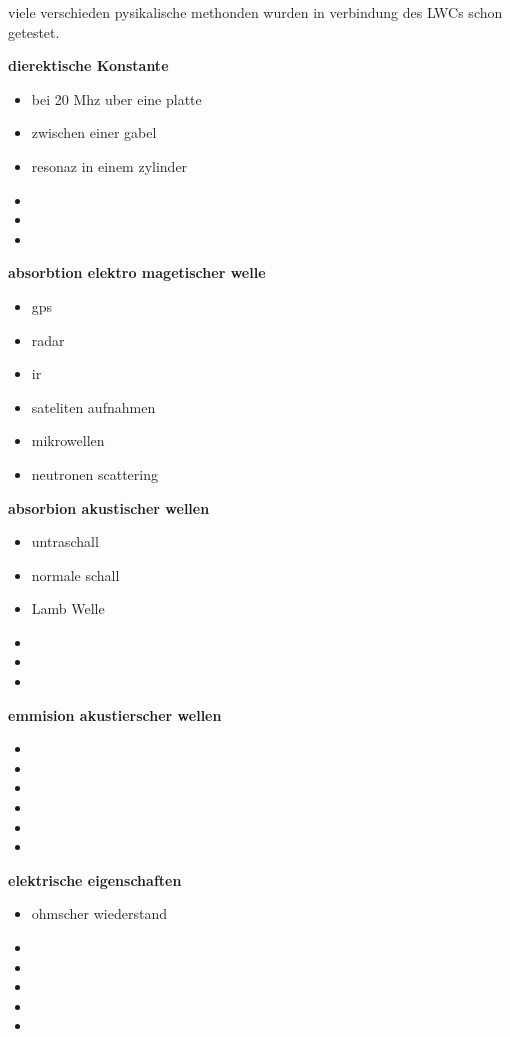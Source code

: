 viele verschieden pysikalische methonden wurden in verbindung des LWCs schon getestet.

\textbf{dierektische Konstante}
\begin{itemize}
\item bei 20 Mhz uber eine platte
\item zwischen einer gabel
\item resonaz in einem zylinder
\item 
\item
\item
\end{itemize}

\textbf{absorbtion elektro magetischer welle}
\begin{itemize}
\item gps
\item radar
\item ir
\item sateliten aufnahmen
\item mikrowellen
\item neutronen scattering
\end{itemize}


\textbf{absorbion akustischer wellen}
\begin{itemize}
\item untraschall
\item normale schall
\item Lamb Welle
\item
\item
\item
\end{itemize}


\textbf{emmision akustierscher wellen}
\begin{itemize}
\item
\item
\item
\item
\item
\item
\end{itemize}


\textbf{elektrische eigenschaften}
\begin{itemize}
\item ohmscher wiederstand
\item
\item
\item
\item
\item
\end{itemize}


